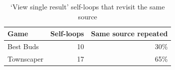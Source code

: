\begin{table}[t]
\centering
\caption{`View single result' self-loops that revisit the same source}
\label{tab:rq7-self-loop-same-source}
\begin{tabular}{lrr}
\toprule
Game & Self-loops & Same source repeated \\
\midrule
Best Buds & 10 & 30\% \\
Townscaper & 17 & 65\% \\
\bottomrule
\end{tabular}
\end{table}
